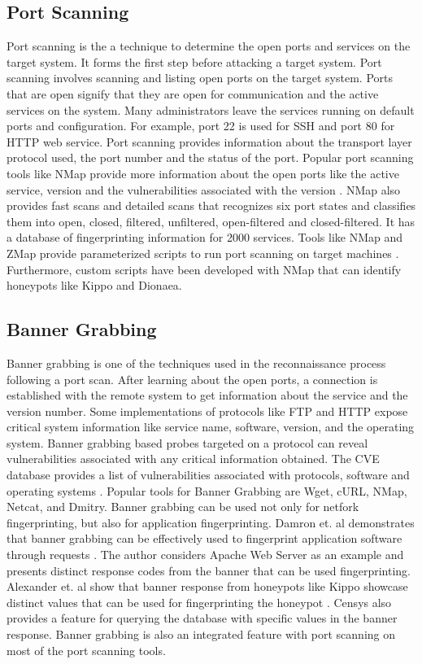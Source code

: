 \subsection{Port Scanning}
Port scanning is the a technique to determine the open ports and services on the target system. It forms the first step before attacking a target system. Port scanning involves scanning and listing open ports on the target system. Ports that are open signify that they are open for communication and the active services on the system. Many administrators leave the services running on default ports and configuration. For example, port 22 is used for SSH and port 80 for HTTP web service. Port scanning provides information about the transport layer protocol used, the port number and the status of the port. Popular port scanning tools like NMap provide more information about the open ports like the active service, version and the vulnerabilities associated with the version \cite{NMap}. NMap also provides fast scans and detailed scans that recognizes six port states and classifies them into open, closed, filtered, unfiltered, open-filtered and closed-filtered. It has a database of fingerprinting information for 2000 services. 
Tools like NMap and ZMap provide parameterized scripts to run port scanning on target machines \cite{zmap}. Furthermore, custom scripts have been developed with NMap that can identify honeypots like Kippo and Dionaea.  

\subsection{Banner Grabbing}
Banner grabbing is one of the techniques used in the reconnaissance process following a port scan. After learning about the open ports, a connection is established with the remote system to get information about the service and the version number. Some implementations of protocols like FTP and HTTP expose critical system information like service name, software, version, and the operating system. Banner grabbing based probes targeted on a protocol can reveal vulnerabilities associated with any critical information obtained. The CVE database provides a list of vulnerabilities associated with protocols, software and operating systems  \cite{CVE}. Popular tools for Banner Grabbing are Wget\cite{wget}, cURL\cite{curl}, NMap\cite{NMap}, Netcat\cite{netcat}, and Dmitry\cite{dmitry}. Banner grabbing can be used not only for netfork fingerprinting, but also for application fingerprinting. Damron et. al  demonstrates that banner grabbing can be effectively used to fingerprint application software through requests \cite{bannergrab}. The author considers Apache Web Server as an example and presents distinct response codes from the banner that can be used fingerprinting. Alexander et. al  show that banner response from honeypots like Kippo showcase distinct values that can be used for fingerprinting the honeypot \cite{Vetterl2018}. Censys also provides a feature for querying the database with specific values in the banner response. Banner grabbing is also an integrated feature with port scanning on most of the port scanning tools. 

